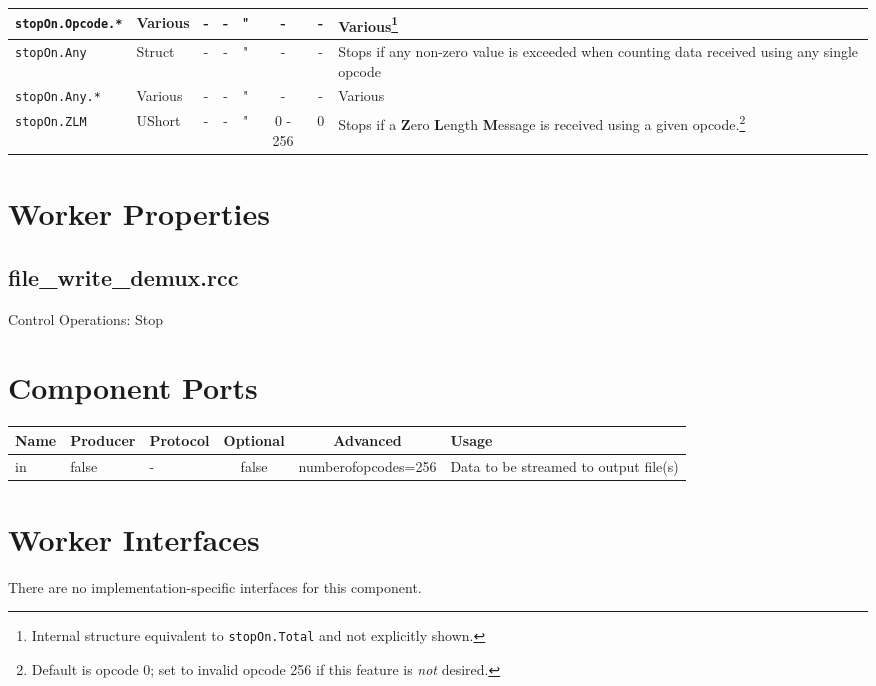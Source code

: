 \documentclass{article}
\def\comp{file\_write\_demux}
\begin{document}
\begin{landscape}
\begin{minipage}{\textwidth}
\begin{scriptsize}
\begin{tabular}{|p{3cm}|p{1.5cm}|c|c|c|c|c|p{7cm}|}
      \hline
      \verb+stopOn.Opcode.*+        & Various   & -              & -               & "                  & -           & -             & Various\footnote{\label{stopon}Internal structure equivalent to \texttt{stopOn.Total} and not explicitly shown.} \\
      \hline
      \verb+stopOn.Any+             & Struct    & -              & -               & "                  & -           & -             & Stops if any non-zero value is exceeded when counting data received using any single opcode \\
      \hline
      \verb+stopOn.Any.*+           & Various   & -              & -               & "                  & -           & -             & Various \\
      \hline
      \verb+stopOn.ZLM+             & UShort    & -              & -               & "                  & 0 - 256     & 0             & Stops if a \textbf{Z}ero \textbf{L}ength \textbf{M}essage is received using a given opcode.\footnote{Default is opcode 0; set to invalid opcode 256 if this feature is \textit{not} desired.} \\
      \hline
    \end{tabular}
  \end{scriptsize}
  \end{minipage}
  \section*{Worker Properties}
  \subsection*{\comp.rcc}
	Control Operations: Stop

  \section*{Component Ports}
  \begin{scriptsize}
    \begin{tabular}{|M{2cm}|M{1.5cm}|M{4cm}|c|c|M{9cm}|}
      \hline
      Name & Producer & Protocol & Optional & Advanced            & Usage \\
      \hline
			in   & false    & -        & false    & numberofopcodes=256 & Data to be streamed to output file(s) \\
      \hline
    \end{tabular}
  \end{scriptsize}

  \section*{Worker Interfaces}
  There are no implementation-specific interfaces for this component.
\end{landscape}
\end{document}
